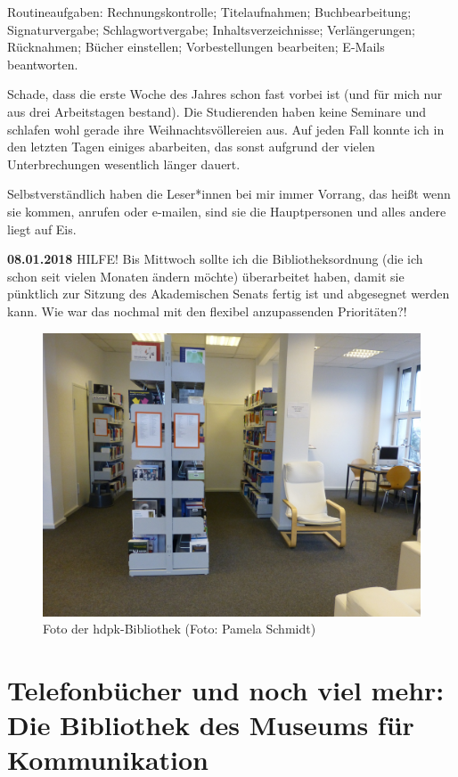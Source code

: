 \documentclass[a4paper,
fontsize=11pt,
oneside,
numbers=noperiodatend,
parskip=half-,
bibliography=totoc,
final
]{scrartcl}
\begin{document}
Routineaufgaben: Rechnungskontrolle; Titelaufnahmen; Buchbearbeitung;
Signaturvergabe; Schlagwortvergabe; Inhaltsverzeichnisse;
Verlängerungen; Rücknahmen; Bücher einstellen; Vorbestellungen
bearbeiten; E-Mails beantworten.

Schade, dass die erste Woche des Jahres schon fast vorbei ist (und für
mich nur aus drei Arbeitstagen bestand). Die Studierenden haben keine
Seminare und schlafen wohl gerade ihre Weihnachtsvöllereien aus. Auf
jeden Fall konnte ich in den letzten Tagen einiges abarbeiten, das sonst
aufgrund der vielen Unterbrechungen wesentlich länger dauert.

Selbstverständlich haben die Leser*innen bei mir immer Vorrang, das
heißt wenn sie kommen, anrufen oder e-mailen, sind sie die Hauptpersonen
und alles andere liegt auf Eis.

\textbf{08.01.2018} HILFE! Bis Mittwoch sollte ich die
Bibliotheksordnung (die ich schon seit vielen Monaten ändern möchte)
überarbeitet haben, damit sie pünktlich zur Sitzung des Akademischen
Senats fertig ist und abgesegnet werden kann. Wie war das nochmal mit
den flexibel anzupassenden Prioritäten?!

\begin{figure}
\centering
\includegraphics{img/Schmidt_5.jpg}
\caption{Foto der hdpk-Bibliothek (Foto: Pamela Schmidt)}
\end{figure}

\hypertarget{telefonbuxfccher-und-noch-viel-mehr-die-bibliothek-des-museums-fuxfcr-kommunikation}{%
\section{Telefonbücher und noch viel mehr: Die Bibliothek des
Museums für
Kommunikation}\label{telefonbuxfccher-und-noch-viel-mehr-die-bibliothek-des-museums-fuxfcr-kommunikation}}
\end{document}
